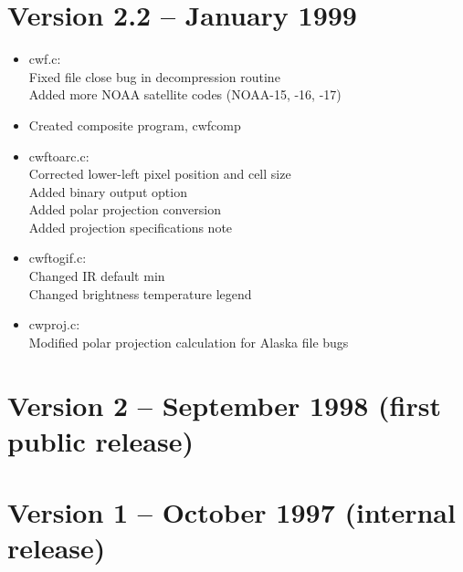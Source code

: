 
\section{Version 2.2 -- January 1999}

\begin{itemize}

  \item cwf.c:\\
  Fixed file close bug in decompression routine\\
  Added more NOAA satellite codes (NOAA-15, -16, -17)

  \item Created composite program, cwfcomp

  \item cwftoarc.c:\\
  Corrected lower-left pixel position and cell size\\
  Added binary output option\\
  Added polar projection conversion\\
  Added projection specifications note

  \item cwftogif.c:\\
  Changed IR default min\\
  Changed brightness temperature legend

  \item cwproj.c:\\
  Modified polar projection calculation for Alaska file bugs\\

\end{itemize}


\section{Version 2 -- September 1998 (first public release)}


\section{Version 1 -- October 1997 (internal release)}

